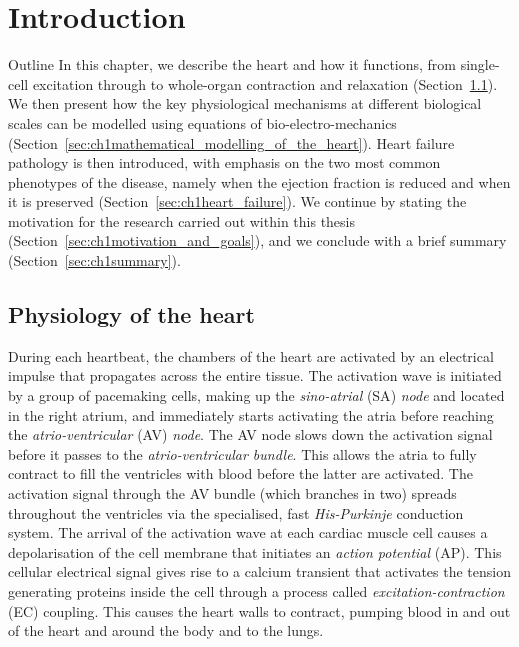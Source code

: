 \chapter{Introduction}\label{cha:chapter1}
%
%
%
\begin{remark}{Outline}
    In this chapter, we describe the heart and how it functions, from single-cell excitation through to whole-organ contraction and relaxation (Section~\ref{sec:ch1physiology_of_the_heart}). We then present how the key physiological mechanisms at different biological scales can be modelled using equations of bio-electro-mechanics (Section~\ref{sec:ch1mathematical_modelling_of_the_heart}). Heart failure pathology is then introduced, with emphasis on the two most common phenotypes of the disease, namely when the ejection fraction is reduced and when it is preserved (Section~\ref{sec:ch1heart_failure}). We continue by stating the motivation for the research carried out within this thesis (Section~\ref{sec:ch1motivation_and_goals}), and we conclude with a brief summary (Section~\ref{sec:ch1summary}).
\end{remark}


%
%
%
\section{Physiology of the heart}\label{sec:ch1physiology_of_the_heart}
During each heartbeat, the chambers of the heart are activated by an electrical impulse that propagates across the entire tissue. The activation wave is initiated by a group of pacemaking cells, making up the \textit{sino-atrial} (\acs{SA}) \textit{node} and located in the right atrium, and immediately starts activating the atria before reaching the \textit{atrio-ventricular} (\acs{AV}) \textit{node}. The AV node slows down the activation signal before it passes to the \textit{atrio-ventricular bundle}. This allows the atria to fully contract to fill the ventricles with blood before the latter are activated. The activation signal through the AV bundle (which branches in two) spreads throughout the ventricles via the specialised, fast \textit{His-Purkinje} conduction system. The arrival of the activation wave at each cardiac muscle cell causes a depolarisation of the cell membrane that initiates an \textit{action potential} (\acs{AP}). This cellular electrical signal gives rise to a calcium transient that activates the tension generating proteins inside the cell through a process called \textit{excitation-contraction} (\acs{EC}) coupling. This causes the heart walls to contract, pumping blood in and out of the heart and around the body and to the lungs.

